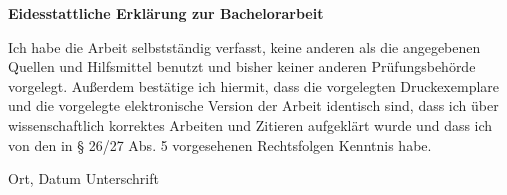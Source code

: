 \textbf{Eidesstattliche Erklärung zur Bachelorarbeit}

Ich habe die Arbeit selbstständig verfasst, keine anderen als die angegebenen Quellen und Hilfsmittel benutzt und bisher keiner anderen Prüfungsbehörde vorgelegt. Außerdem bestätige ich hiermit, dass die vorgelegten Druckexemplare und die vorgelegte elektronische Version der Arbeit identisch sind, dass ich über wissenschaftlich korrektes Arbeiten und Zitieren aufgeklärt wurde und dass ich von den in § 26/27 Abs. 5 vorgesehenen Rechtsfolgen Kenntnis habe.

\vspace{3cm}
Ort, Datum \hspace{5cm} Unterschrift\\

